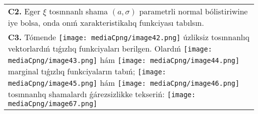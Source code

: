 \documentclass{article}
\begin{document}
\begin{tabular}{m{17cm}}
 \\
\textbf{C2.} Eger \(\xi\) tosınnanlı shama \((a,\sigma)\) parametrli normal bólistiriwine iye bolsa, onda onıń xarakteristikalıq funkciyası tabılsın.
 \\
\textbf{C3.} Tómende \texttt{[image: mediaCpng/image42.png]} úzliksiz tosınnanlıq vektorlardıń tıǵızlıq funkciyaları berilgen. Olardıń \texttt{[image: mediaCpng/image43.png]} hám \texttt{[image: mediaCpng/image44.png]} marginal tıǵızlıq funkciyaların tabıń; \texttt{[image: mediaCpng/image45.png]} hám \texttt{[image: mediaCpng/image46.png]} tosınnanlıq shamalardı ǵárezsizlikke tekseriń: \texttt{[image: mediaCpng/image67.png]}
 \\

\end{tabular}
\vspace{1cm}
\end{document}
